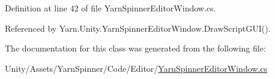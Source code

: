 Definition at line 42 of file Yarn\-Spinner\-Editor\-Window.\-cs.



Referenced by Yarn.\-Unity.\-Yarn\-Spinner\-Editor\-Window.\-Draw\-Script\-G\-U\-I().



The documentation for this class was generated from the following file\-:\begin{DoxyCompactItemize}
\item 
Unity/\-Assets/\-Yarn\-Spinner/\-Code/\-Editor/\hyperlink{a00278}{Yarn\-Spinner\-Editor\-Window.\-cs}\end{DoxyCompactItemize}

